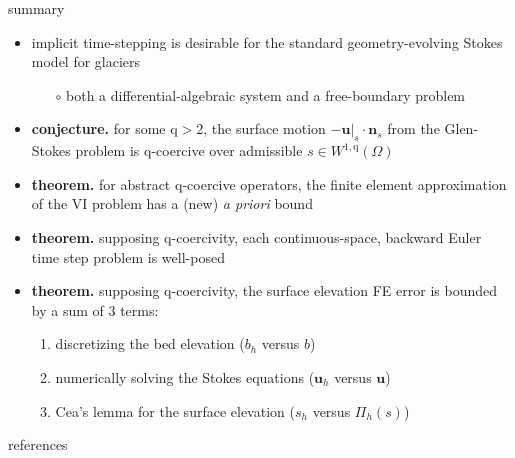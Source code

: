 \documentclass[10pt,svgnames]{beamer}
\newcommand{\bn}{\mathbf{n}}
\newcommand{\bu}{\mathbf{u}}
\newcommand{\qq}{\mathrm{q}}
\begin{document}
\begin{frame}{summary}
\begin{itemize}
\item implicit time-stepping is desirable for the standard geometry-evolving Stokes model for glaciers
    \begin{itemize}
    \item[$\circ$] both a differential-algebraic system and a free-boundary problem
    \end{itemize}
\item<2-5> \textbf{conjecture.} for some $\qq>2$, the surface motion $-\bu|_s\cdot \bn_s$ from the Glen-Stokes problem is $\qq$-coercive over admissible $s\in W^{1,\qq}(\Omega)$
\item<3-5> \textbf{theorem.} for abstract $\qq$-coercive operators, the finite element approximation of the VI problem has a (new) \emph{a priori} bound
\item<4-5> \textbf{theorem.} supposing $\qq$-coercivity, each continuous-space, backward Euler time step problem is well-posed
\item<5> \textbf{theorem.} supposing $\qq$-coercivity, the surface elevation FE error is bounded by a sum of 3 terms:
    \begin{enumerate}
    \item discretizing the bed elevation ($b_h$ versus $b$)
    \item numerically solving the Stokes equations ($\bu_h$ versus $\bu$)
    \item Cea's lemma for the surface elevation ($s_h$ versus $\Pi_h(s)$) \strut
    \end{enumerate}
\end{itemize}
\end{frame}


\begin{frame}{references}

{\footnotesize }
\end{frame}
\end{document}
